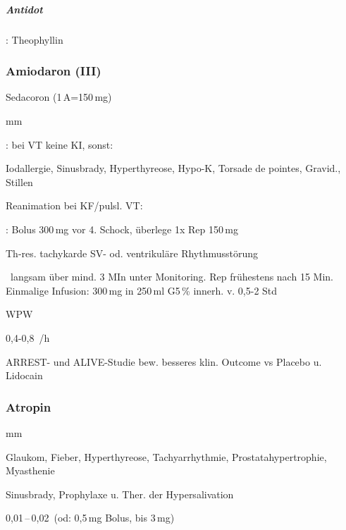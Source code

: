 \subparagraph{Antidot}: Theophyllin





\subsubsection{Amiodaron (\textrm{III})}

Sedacoron (1\,A=150\,mg)
\begin{labeling}[:]{mm}
\item[KI] : bei VT keine KI, sonst:

Iodallergie, Sinusbrady, Hyperthyreose, Hypo-K, Torsade de pointes,
Gravid., Stillen

\item[In]  Reanimation bei KF/pulsl. VT:

\item[Rx] : Bolus 300\,mg vor 4. Schock, überlege 1x Rep
150\,mg

\item[In] Th-res. tachykarde SV- od. ventrikuläre
Rhythmusstörung

\item[Rx] \, langsam über mind. 3 MIn unter
Monitoring. Rep frühestens nach 15 Min.\newline
Einmalige Infusion: 300\,mg in 250\,ml G5\,\% innerh. v. 0,5-2 Std


\item[In] WPW

\item[Rx] 0,4-0,8 \,/h

ARREST- und ALIVE-Studie bew. besseres klin. Outcome vs Placebo u.
Lidocain


\end{labeling}


\subsubsection{Atropin}

\begin{labeling}[:]{mm}
  \item[KI] Glaukom, Fieber, Hyperthyreose, Tachyarrhythmie,
  Prostatahypertrophie, Myasthenie
  \item[In] 
  \item[KI] Sinusbrady, Prophylaxe u. Ther. der Hypersalivation
  \item[Rx] 0,01\,--\,0,02\, (od: 0,5\,mg Bolus, bis 3\,mg)
\end{labeling}

